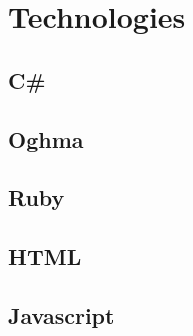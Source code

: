 \chapter{Technologies}\label{chap:technologies}

\section{C\#}\label{sec:csharp}

\section{Oghma}\label{sec:oghma}

\section{Ruby}\label{sec:technologies:ruby}

\section{HTML}\label{sec:html}

\section{Javascript}\label{sec:javascript}

